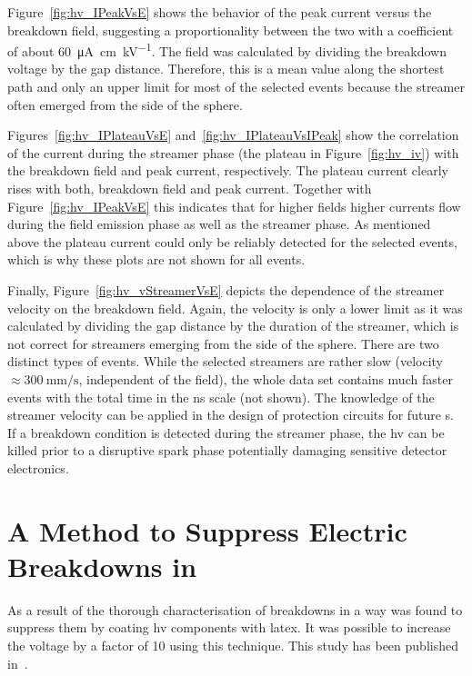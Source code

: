 Figure~\ref{fig:hv_IPeakVsE} shows the behavior of the peak current versus the breakdown field, suggesting a proportionality between the two with a coefficient of about \SI{60}{\micro\ampere\centi\metre\per\kilo\volt}.
The field was calculated by dividing the breakdown voltage by the gap distance.
Therefore, this is a mean value along the shortest path and only an upper limit for most of the selected events because the streamer often emerged from the side of the sphere.

Figures~\ref{fig:hv_IPlateauVsE} and~\ref{fig:hv_IPlateauVsIPeak} show the correlation of the current during the streamer phase (the plateau in Figure~\ref{fig:hv_iv}) with the breakdown field and peak current, respectively.
The plateau current clearly rises with both, breakdown field and peak current.
Together with Figure~\ref{fig:hv_IPeakVsE} this indicates that for higher fields higher currents flow during the field emission phase as well as the streamer phase.
As mentioned above the plateau current could only be reliably detected for the selected events, which is why these plots are not shown for all events.

Finally, Figure~\ref{fig:hv_vStreamerVsE} depicts the dependence of the streamer velocity on the breakdown field.
Again, the velocity is only a lower limit as it was calculated by dividing the gap distance by the duration of the streamer, which is not correct for streamers emerging from the side of the sphere.
There are two distinct types of events.
While the selected streamers are rather slow (velocity $\approx \SI{300}{\milli\metre\per\second}$, independent of the field), the whole data set contains much faster events with the total time in the \si{\nano\second} scale (not shown).
The knowledge of the streamer velocity can be applied in the design of protection circuits for future \lartpc{}s.
If a breakdown condition is detected during the streamer phase, the \gls{hv} can be killed prior to a disruptive spark phase potentially damaging sensitive detector electronics.


\section{A Method to Suppress Electric Breakdowns in }
\label{sec:studies_latex}

As a result of the thorough characterisation of breakdowns in \lar{} a way was found to suppress them by coating \gls{hv} components with latex.
It was possible to increase the voltage by a factor of \num{10} using this technique.
This study has been published in~\cite{latex}.

